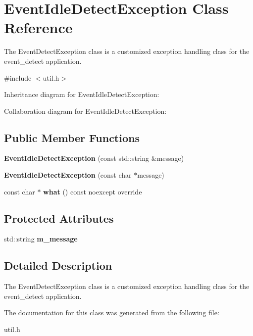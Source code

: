 \hypertarget{classEventIdleDetectException}{}\section{Event\+Idle\+Detect\+Exception Class Reference}
\label{classEventIdleDetectException}


The Event\+Detect\+Exception class is a customized exception handling class for the event\+\_\+detect application.  




{\ttfamily \#include $<$util.\+h$>$}



Inheritance diagram for Event\+Idle\+Detect\+Exception\+:


Collaboration diagram for Event\+Idle\+Detect\+Exception\+:
\subsection*{Public Member Functions}
\begin{DoxyCompactItemize}
\item 
\mbox{\label{classEventIdleDetectException_a06a53812001f2bdb132cd13d6f0da60b}} 
{\bfseries Event\+Idle\+Detect\+Exception} (const std\+::string \&message)
\item 
\mbox{\label{classEventIdleDetectException_a230c450eb3e521ba0de5d513bd36f967}} 
{\bfseries Event\+Idle\+Detect\+Exception} (const char $\ast$message)
\item 
\mbox{\label{classEventIdleDetectException_a0a1fc0d10baa4691bd0af9fc2e53be6c}} 
const char $\ast$ {\bfseries what} () const noexcept override
\end{DoxyCompactItemize}
\subsection*{Protected Attributes}
\begin{DoxyCompactItemize}
\item 
\mbox{\label{classEventIdleDetectException_a9596e4de51ed2adbae36df4651f9f8d7}} 
std\+::string {\bfseries m\+\_\+message}
\end{DoxyCompactItemize}


\subsection{Detailed Description}
The Event\+Detect\+Exception class is a customized exception handling class for the event\+\_\+detect application. 

The documentation for this class was generated from the following file\+:\begin{DoxyCompactItemize}
\item 
util.\+h\end{DoxyCompactItemize}
